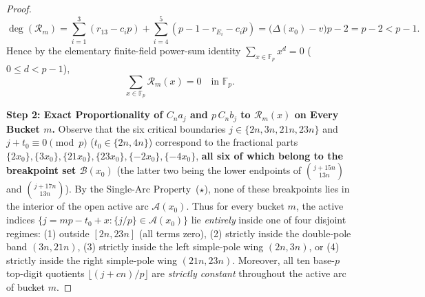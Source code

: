 \documentclass[11pt,reqno]{amsart}
\theoremstyle{definition}
\theoremstyle{remark}
\newcommand{\FF}{\mathbb{F}}
\begin{document}
\begin{proof}
\begin{equation}
\label{eq:deg-p-2}
  \deg(\mathcal{R}_m)
  = \sum_{i=1}^{3}(r_{13} - c_i p) + \sum_{i=4}^{5}(p - 1 - r_{E_i} - c_i p)
  = \bigl(\Delta(x_0) - v\bigr) p - 2 = p - 2 < p - 1.
\end{equation}
Hence by the elementary finite-field power-sum identity $\sum_{x \in \FF_p} x^d = 0$ ($0 \le d < p - 1$),
\begin{equation}
\label{eq:sum-Rm-zero}
  \sum_{x \in \FF_p} \mathcal{R}_m(x) = 0 \quad \text{in } \FF_p.
\end{equation}

\medskip
\noindent\textbf{Step 2: Exact Proportionality of $C_n a_j$ and $p\,C_n b_j$ to $\mathcal{R}_m(x)$ on Every Bucket $m$.}
Observe that the six critical boundaries $j \in \{2n, 3n, 21n, 23n\}$ and $j + t_0 \equiv 0 \pmod p$ ($t_0 \in \{2n, 4n\}$) correspond to the fractional parts $\{2x_0\}, \{3x_0\}, \{21x_0\}, \{23x_0\}, \{-2x_0\}, \{-4x_0\}$, \textbf{all six of which belong to the breakpoint set $\mathcal{B}(x_0)$} (the latter two being the lower endpoints of $\binom{j+15n}{13n}$ and $\binom{j+17n}{13n}$). By the Single-Arc Property~($\star$), none of these breakpoints lies in the interior of the open active arc $\mathcal{A}(x_0)$. Thus for every bucket $m$, the active indices $\{j = mp - t_0 + x : \{j/p\} \in \mathcal{A}(x_0)\}$ lie \emph{entirely} inside one of four disjoint regimes: (1) outside $[2n, 23n]$ (all terms zero), (2) strictly inside the double-pole band $(3n, 21n)$, (3) strictly inside the left simple-pole wing $(2n, 3n)$, or (4) strictly inside the right simple-pole wing $(21n, 23n)$. Moreover, all ten base-$p$ top-digit quotients $\lfloor(j+cn)/p\rfloor$ are \emph{strictly constant} throughout the active arc of bucket $m$.


\end{proof}
\end{document}
